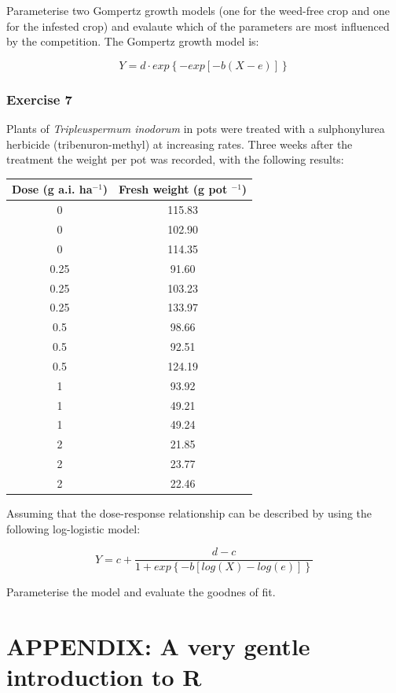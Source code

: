 \documentclass[a4paper,12pt,oneside]{book}
\begin{document}
Parameterise two Gompertz growth models (one for the weed-free crop and one for the infested crop) and evalaute which of the parameters are most influenced by the competition. The Gompertz growth model is:

\[Y = d \cdot exp\left\{- exp \left[ - b (X - e)\right] \right\}\]

\hypertarget{exercise-7}{%
\subsection{Exercise 7}\label{exercise-7}}

Plants of \emph{Tripleuspermum inodorum} in pots were treated with a sulphonylurea herbicide (tribenuron-methyl) at increasing rates. Three weeks after the treatment the weight per pot was recorded, with the following results:

\begin{longtable}[]{@{}cc@{}}
\toprule
Dose (g a.i. ha\(^{-1}\)) & Fresh weight (g pot \(^{-1}\)) \\
\midrule
\endhead
0 & 115.83 \\
0 & 102.90 \\
0 & 114.35 \\
0.25 & 91.60 \\
0.25 & 103.23 \\
0.25 & 133.97 \\
0.5 & 98.66 \\
0.5 & 92.51 \\
0.5 & 124.19 \\
1 & 93.92 \\
1 & 49.21 \\
1 & 49.24 \\
2 & 21.85 \\
2 & 23.77 \\
2 & 22.46 \\
\bottomrule
\end{longtable}

Assuming that the dose-response relationship can be described by using the following log-logistic model:

\[Y = c + \frac{d - c}{1 + exp \left\{ - b \left[ log (X) - log (e) \right] \right\}}\]

Parameterise the model and evaluate the goodnes of fit.

\hypertarget{appendix-a-very-gentle-introduction-to-r}{%
\chapter{APPENDIX: A very gentle introduction to R}\label{appendix-a-very-gentle-introduction-to-r}}
\end{document}
